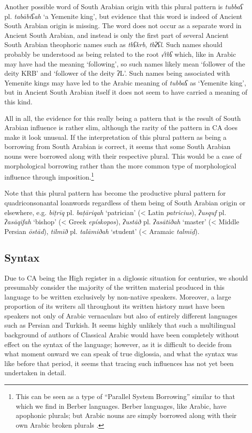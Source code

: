 \documentclass[output=paper]{langsci/langscibook}
\begin{document}
Another possible word of South Arabian origin with this plural pattern is \textit{tubbaʕ} pl. \textit{tabābiʕah} ‘a Yemenite king’, but evidence that this word is indeed of Ancient South Arabian origin is missing. The word does not occur as a separate word in Ancient South Arabian, and instead is only the first part of several Ancient South Arabian theophoric names such as \textit{tbʕkrb}, \textit{tbʔʕl}. Such names should probably be understood as being related to the root \textit{√tbʕ} which, like in Arabic may have had the meaning ‘following’, so such names likely mean ‘follower of the deity KRB’ and ‘follower of the deity ʔL’. Such names being associated with Yemenite kings may have led to the Arabic meaning of \textit{tubbaʕ} as ‘Yemenite king’, but in Ancient South Arabian itself it does not seem to have carried a meaning of this kind. 

All in all, the evidence for this really being a pattern that is the result of South Arabian influence is rather slim, although the rarity of the pattern in CA does make it look unusual. If the interpretation of this plural pattern as being a borrowing from South Arabian is correct, it seems that some South Arabian nouns were borrowed along with their respective plural. This would be a case of morphological borrowing rather than the more common type of morphological influence through imposition.\footnote{This can be seen as a type of “Parallel System Borrowing” similar to that which we find in Berber languages. Berber languages, like Arabic, have apophonic plurals; but Arabic nouns are simply borrowed along with their own Arabic broken plurals \citep{Kossmann2010}.} 

Note that this plural pattern has become the productive plural pattern for quadriconsonantal loanwords regardless of them being of South Arabian origin or elsewhere, e.g. \textit{biṭrīq} pl. \textit{baṭāriqah} ‘patrician’ (< Latin \textit{patricius}), \textit{ʔusquf} pl. \textit{ʔasāqifah} ‘bishop’ (< Greek \textit{epískopos}), \textit{ʔustāð} pl. \textit{ʔasātiðah} ‘master’ (< Middle Persian \textit{ōstād}), \textit{tilmīð} pl. \textit{talāmiðah} ‘student’ (< Aramaic \textit{talmīḏ}).

\subsection{\label{bkm:Ref13224809}Syntax}

Due to CA being the High register in a diglossic situation for centuries, we should presumably consider the majority of the written material produced in this language to be written exclusively by non-native speakers. Moreover, a large proportion of its writers all throughout its written history must have been speakers not only of Arabic vernaculars but also of entirely different languages such as Persian and Turkish. It seems highly unlikely that such a multilingual background of authors of Classical Arabic would have been completely without effect on the syntax of the language; however, as it is difficult to decide from what moment onward we can speak of true diglossia, and what the syntax was like before that period, it seems that tracing such influences has not yet been undertaken in detail.
\end{document}
